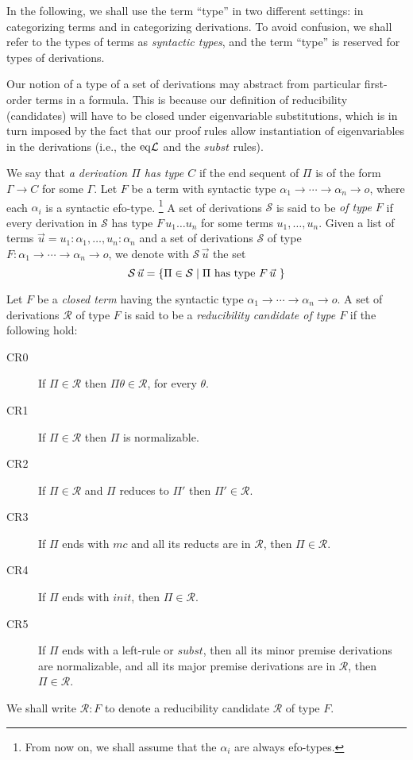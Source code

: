 \documentclass[preprint]{elsarticle}
\def\Rscr{{\mathcal R}}
\def\Sscr{{\mathcal S}}
\newcommand{\Seq}[2]{#1\longrightarrow #2}
\newcommand{\eqL}{{\rm eq}{\cal L}}
\begin{document}
In the following, we shall use the term ``type'' in two different
settings: in categorizing terms and in categorizing derivations.  To
avoid confusion, we shall refer to the types of terms as
\emph{syntactic types}, and the term ``type'' is reserved for types of
derivations.

Our notion of a type of a set of derivations may abstract from
particular first-order terms in a formula. This is because our
definition of reducibility (candidates) will have to be closed under
eigenvariable substitutions, which is in turn imposed by the fact that
our proof rules allow instantiation of eigenvariables in the
derivations (i.e., the $\eqL$ and the $subst$ rules).

\begin{definition}
  \label{def:type-of-drv}
  We say that \emph{a derivation $\Pi$ has type $C$} if the end
  sequent of $\Pi$ is of the form $\Seq{\Gamma}{C}$ for some $\Gamma$.
  Let $F$ be a term with syntactic type $\alpha_1 \to \cdots \to
  \alpha_n \to o$, where each $\alpha_i$ is a syntactic
  efo-type. \footnote{From now on, we shall assume that the $\alpha_i$
  are always efo-types.}  A
  set of derivations $\Sscr$ is said to be \emph{of type $F$} if every
  derivation in $\Sscr$ has type $F\,u_1 \ldots u_n$ for some terms
  $u_1,\ldots,u_n$.  Given a list of terms $\vec u = u_1 : \alpha_1,
  \ldots, u_n : \alpha_n$ and a set of derivations $\Sscr$ of type $F
  : \alpha_1 \to \cdots \to \alpha_n \to o$, we denote with
  $\Sscr\,\vec u$ the set
$$
\Sscr\,\vec u = \{\Pi \in \Sscr \mid \hbox{$\Pi$ has type $F\,\vec u$
} \}
$$
\end{definition}


\vskip10pt

\begin{definition}
  \label{def:candidates}
  Let $F$ be a \emph{closed term} having the syntactic type $\alpha_1
  \to \cdots \to \alpha_n \to o$.  A set of derivations $\Rscr$ of
  type $F$ is said to be a \emph{reducibility candidate of type $F$}
  if the following hold:
  \begin{description}
  \item[CR0] If $\Pi \in \Rscr$ then $\Pi\theta \in \Rscr$, for every
    $\theta$.
  \item[CR1] If $\Pi \in \Rscr$ then $\Pi$ is normalizable.
  \item[CR2] If $\Pi \in \Rscr$ and $\Pi$ reduces to $\Pi'$ then $\Pi'
    \in \Rscr$.
  \item[CR3] If $\Pi$ ends with $mc$ and all its reducts are in
    $\Rscr$, then $\Pi \in \Rscr$.
  \item[CR4] If $\Pi$ ends with $init$, then $\Pi \in \Rscr$.
  \item[CR5] If $\Pi$ ends with a left-rule or $subst$, then all its minor premise
    derivations are normalizable, and all its major premise
    derivations are in $\Rscr$, then $\Pi \in \Rscr$.
  \end{description}
  We shall write $\Rscr : F$ to denote a reducibility candidate
  $\Rscr$ of type $F$.
\end{definition}
\end{document}
